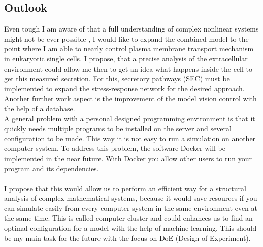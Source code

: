 \subsection{Outlook}
Even tough I am aware of that a full understanding of complex nonlinear systems might not be ever possible \cite{Noell2018}, I would like to expand the combined model to the point where I am able to nearly control plasma membrane transport mechanism in eukaryotic single cells. I propose, that a precise analysis of the extracellular environment could allow me then to get an idea what happens inside the cell to get this measured secretion. For this, secretory pathways (SEC) must be implemented to expand the stress-response network for the desired approach.\\
Another further work aspect is the improvement of the model vision control with the help of a database. \\
A general problem with a personal designed programming environment is that it quickly needs multiple programs to be installed on the server and several configuration to be made. This way it is not easy to run a simulation on another computer system. To address this problem, the software Docker will be implemented in the near future. With Docker you allow other users to run your program and its dependencies. \\\\I propose that this would allow us to perform an efficient way for a structural analysis of complex mathematical systems, because it would save resources if you can simulate easily from every computer system in the same environment even at the same time. This is called computer cluster and could enhances us to find an optimal configuration for a model with the help of machine learning. This should be my main task for the future with the focus on DoE (Design of Experiment).
\newpage